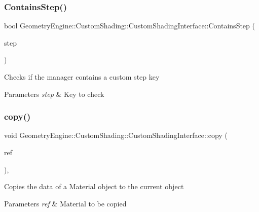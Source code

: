 \subsubsection{\texorpdfstring{ContainsStep()}{ContainsStep()}}
{\footnotesize\ttfamily bool Geometry\+Engine\+::\+Custom\+Shading\+::\+Custom\+Shading\+Interface\+::\+Contains\+Step (\begin{DoxyParamCaption}\item[{\mbox{\hyperlink{namespace_geometry_engine_1_1_custom_shading_a2dc236a5b567da5099069ce2b2be5609}{Custom\+Shading\+Steps}}}]{step }\end{DoxyParamCaption})\hspace{0.3cm}{\ttfamily [inline]}}

Checks if the manager contains a custom step key 
\begin{DoxyParams}{Parameters}
{\em step} & Key to check \\
\hline
\end{DoxyParams}
\mbox{\label{class_geometry_engine_1_1_custom_shading_1_1_custom_shading_interface_a7ecb7c9e61cb2e8f2cca7a4f2f156539}} 
\subsubsection{\texorpdfstring{copy()}{copy()}}
{\footnotesize\ttfamily void Geometry\+Engine\+::\+Custom\+Shading\+::\+Custom\+Shading\+Interface\+::copy (\begin{DoxyParamCaption}\item[{const \mbox{\hyperlink{class_geometry_engine_1_1_custom_shading_1_1_custom_shading_interface}{Custom\+Shading\+Interface}} \&}]{ref }\end{DoxyParamCaption})\hspace{0.3cm}{\ttfamily [protected]}, {\ttfamily [virtual]}}

Copies the data of a Material object to the current object 
\begin{DoxyParams}{Parameters}
{\em ref} & Material to be copied \\
\hline
\end{DoxyParams}
\mbox{\label{class_geometry_engine_1_1_custom_shading_1_1_custom_shading_interface_ae5f0bbc37cd6333fd389acabb2723c34}} 
